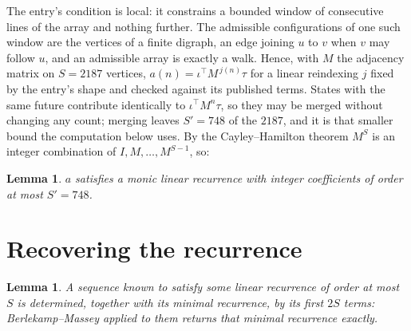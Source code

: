 \documentclass[11pt,a4paper]{article}
\theoremstyle{plain}
\newtheorem{lemma}[theorem]{Lemma}
\theoremstyle{definition}
\begin{document}
The entry's condition is local: it constrains a bounded window of consecutive lines of the
array and nothing further. The admissible configurations of one such window are the vertices
of a finite digraph, an edge joining $u$ to $v$ when $v$ may follow $u$, and an admissible
array is exactly a walk. Hence, with $M$ the adjacency matrix on $S=2187$ vertices,
$a(n)=\iota^{\!\top}M^{\,j(n)}\tau$ for a linear reindexing $j$ fixed by the entry's shape
and checked against its published terms. States with the same future contribute identically to $\iota^{\!\top}M^n\tau$, so they may be merged without changing any count; merging leaves $S'=748$ of the $2187$, and it is that smaller bound the computation below uses. By the Cayley--Hamilton theorem $M^{S}$ is an
integer combination of $I,M,\dots,M^{S-1}$, so:

\begin{lemma}\label{lem:cf}
$a$ satisfies a monic linear recurrence with integer coefficients of order at most
$S'=748$.
\end{lemma}

\section{Recovering the recurrence}

\begin{lemma}\label{lem:bm}
A sequence known to satisfy some linear recurrence of order at most $S$ is determined, together
with its minimal recurrence, by its first $2S$ terms: Berlekamp--Massey applied to them returns
that minimal recurrence exactly.
\end{lemma}
\end{document}
